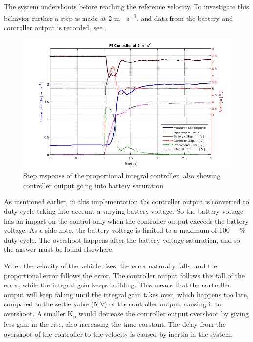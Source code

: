 %
The system undershoots before reaching the reference velocity. To investigate this behavior further a step is made at 2 \si{m\cdot s^{-1}}, and data from the battery and controller output is recorded, see .
%
\begin{figure}[H]
 	\centering
 	\includegraphics[width=.9\textwidth]{figures/PInoAntiWindup}
 	\caption{Step response of the proportional integral controller, also showing controller output going into battery saturation}
 	\label{fig:PInoAntiWindup}
\end{figure}
%
As mentioned earlier, in this implementation the controller output is converted to duty cycle taking into account a varying battery voltage. So the battery voltage has an impact on the control only when the controller output exceeds the battery voltage. As a side note, the battery voltage is limited to a maximum of \si{100 \ \%} duty cycle.
The overshoot happens after the battery voltage saturation, and so the answer must be found elsewhere.

When the velocity of the vehicle rises, the error naturally falls, and the proportional error follows the error. The controller output follows this fall of the error, while the integral gain keeps building. This means that the controller output will keep falling until the integral gain takes over, which happens too late, compared to the settle value (5 V) of the controller output, causing it to overshoot. A smaller \si{K_p} would decrease the controller output overshoot by giving less gain in the rise, also increasing the time constant.
The delay from the overshoot of the controller to the velocity is caused by inertia in the system.
%
